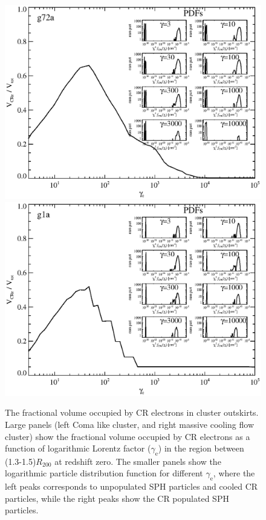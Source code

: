 \documentclass[useAMS,usenatbib]{mn2e}
\newcommand{\e}{\mathrm{e}}
\newcommand{\rvir}{R_{200}}
\newcommand{\gam}{\gamma}
\begin{document}
\begin{figure}
\begin{minipage}{2.0\columnwidth}
  \includegraphics[width=0.49\columnwidth]{./figures/CRvolume.g72a.1.4Rv.a24.full.140.v20.eps}
  \includegraphics[width=0.49\columnwidth]{./figures/CRvolume.g1a.1.4Rv.a24.full.020.v20.eps}
  \caption{The fractional volume occupied by CR electrons in cluster
    outskirts. Large panels (left Coma like cluster, and right massive
    cooling flow cluster) show the fractional volume occupied by CR
    electrons as a function of logarithmic Lorentz factor ($\gam_\e$)
    in the region between (1.3-1.5)$\rvir$ at redshift zero. The
    smaller panels show the logarithmic particle distribution function
    for different $\gam_\e$, where the left peaks corresponds to
    unpopulated SPH particles and cooled CR particles, while the right
    peaks show the CR populated SPH
    particles. \label{fig:e_spec_CRvolume}}
\end{minipage}
\end{figure}
\end{document}
